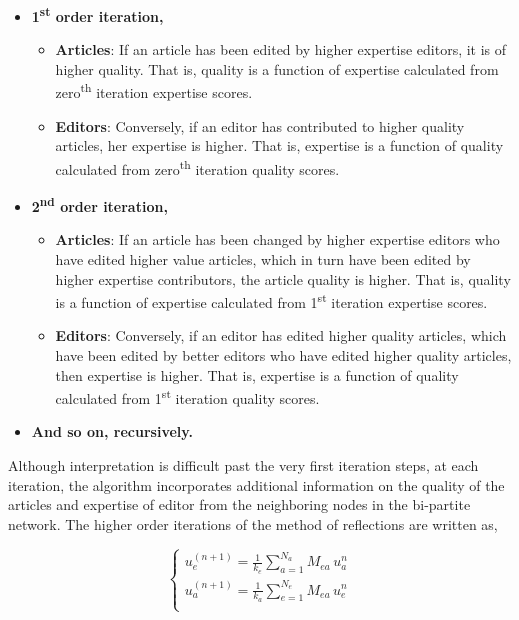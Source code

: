 \begin{itemize}
  \item {\bf 1\textsuperscript{st} order iteration,}  
  \begin{itemize}
  \item {\bf Articles}: If an article has been edited by higher expertise editors, it is of higher quality. That is, quality is a function of expertise calculated from zero\textsuperscript{th} iteration expertise scores.
  \item {\bf Editors}: Conversely, if an editor has contributed to higher quality articles, her expertise is higher. That is, expertise is a function of quality calculated from zero\textsuperscript{th} iteration quality scores.
  \end{itemize}
  \pagebreak
  \item {\bf 2\textsuperscript{nd} order iteration,}
    \begin{itemize}
  \item {\bf Articles}: If an article has been changed by higher expertise editors who have edited higher value articles, which in turn have been edited by higher expertise contributors, the article quality is higher. That is, quality is a function of expertise calculated from 1\textsuperscript{st} iteration expertise scores.
  \item {\bf Editors}: Conversely, if an editor has edited higher quality articles, which have been edited by better editors who have edited higher quality articles, then expertise is higher. That is, expertise is a function of quality calculated from 1\textsuperscript{st} iteration quality scores.
  \end{itemize}
 \item {\bf And so on, recursively.}\\
\end{itemize}

Although interpretation is difficult past the very first iteration steps, at each iteration, the algorithm incorporates additional information on the quality of the articles and expertise of editor from the neighboring nodes in the bi-partite network. The higher order iterations of the method of reflections are written as,

\begin{equation}
\begin{cases}
 u_{e}^{(n+1)} = \frac{1}{k_{e}}\sum_{a=1}^{N_{a}} M_{ea} \, u_{a}^{n}\\[7pt]
 u_{a}^{(n+1)} = \frac{1}{k_{a}}\sum_{e=1}^{N_{e}} M _{ea}\, u_{e}^{n}\\
\end{cases}
\label{HHhigher}
\end{equation}

